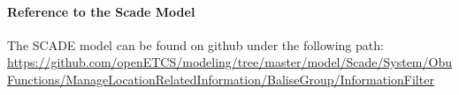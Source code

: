 

\paragraph{Reference to the Scade Model}
The SCADE model can be found on github under the following path: \url{https://github.com/openETCS/modeling/tree/master/model/Scade/System/ObuFunctions/ManageLocationRelatedInformation/BaliseGroup/InformationFilter}
